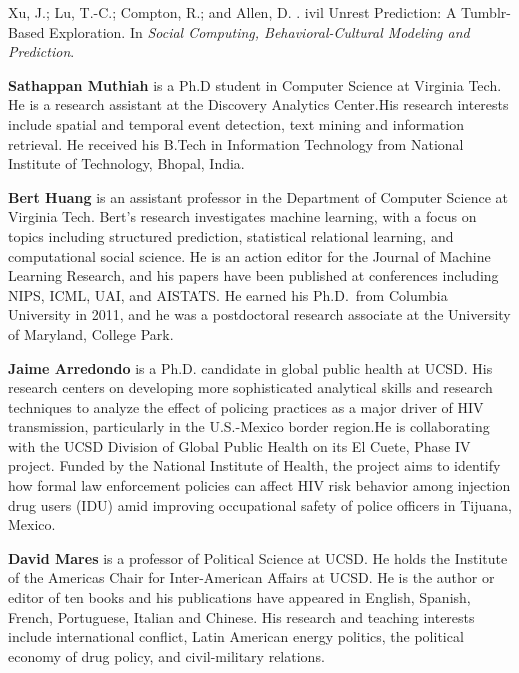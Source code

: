 \documentclass[letterpaper]{article}
\begin{document}
\begin{thebibliography}{}
Xu, J.; Lu, T.-C.; Compton, R.; and Allen, D.
.
ivil {U}nrest {P}rediction: {A} {T}umblr-{B}ased {E}xploration.
\newblock In {\em Social Computing, Behavioral-Cultural Modeling and
  Prediction}.

\end{thebibliography}
\par
{\bf Sathappan Muthiah} is a Ph.D student in Computer Science at
Virginia Tech. He is a research assistant at the Discovery Analytics
Center.His research interests include spatial and temporal event
detection, text mining and information retrieval. He received his B.Tech
in Information Technology from National Institute of Technology, Bhopal,
India.
\par

{\bf Bert Huang} is an assistant professor in the Department of Computer
Science at Virginia Tech. Bert's research investigates machine
learning, with a focus on topics including structured prediction,
statistical relational learning, and computational social science. He is
an action editor for the Journal of Machine Learning Research, and his
papers have been published at conferences including NIPS, ICML, UAI, and
AISTATS. He earned his Ph.D.~from Columbia University
in 2011, and he was a postdoctoral research associate at the University
of Maryland, College Park.
\par

{\bf Jaime Arredondo} is a Ph.D. candidate in global public health at
UCSD. His research centers on developing more sophisticated analytical
skills and research techniques to analyze the effect of policing
practices as a major driver of HIV transmission, particularly in the
U.S.-Mexico border region.He is collaborating with the UCSD Division of Global
Public Health on its El Cuete, Phase IV project. Funded by the National
Institute of Health, the project aims to identify how formal law
enforcement policies can affect HIV risk behavior among injection drug
users (IDU) amid improving occupational safety of police officers in
Tijuana, Mexico.
\par
{\bf David Mares} is a professor of Political Science at UCSD.
He holds the Institute of the Americas Chair for Inter-American Affairs at UCSD.
He is the author or editor of ten books
and his publications have appeared in English, Spanish, French,
Portuguese, Italian and Chinese. His research and teaching interests
include international conflict, Latin American energy politics, the
political economy of drug policy, and civil-military relations.
\par
\end{document}
